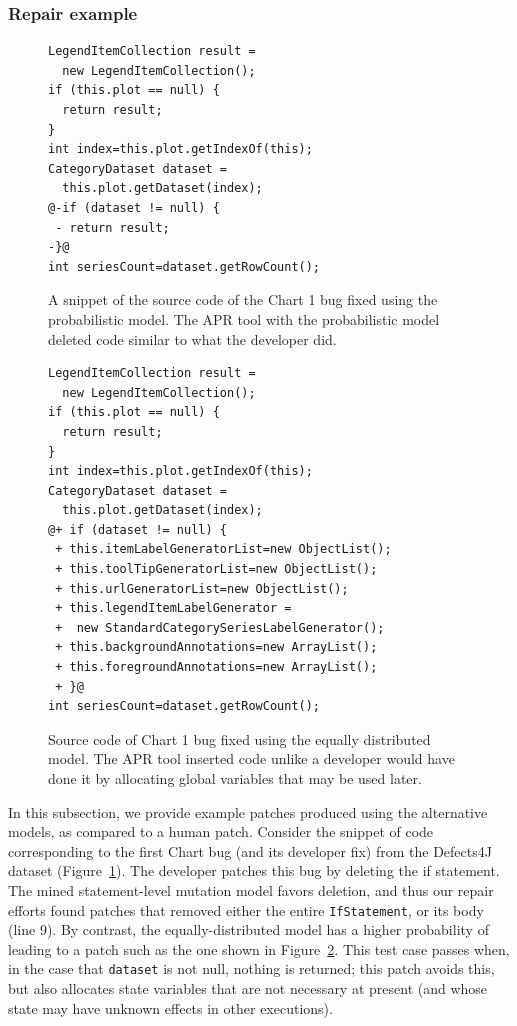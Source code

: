 \documentclass[conference]{IEEEtran}
\begin{document}
\subsubsection{Repair example} \label{examPatches}

\begin{figure}[t]
\begin{lstlisting}[frame=single,style=base]
LegendItemCollection result = 
  new LegendItemCollection();
if (this.plot == null) {
  return result;
}
int index=this.plot.getIndexOf(this);
CategoryDataset dataset = 
  this.plot.getDataset(index);
@-if (dataset != null) {
 - return result;
-}@
int seriesCount=dataset.getRowCount();
	\end{lstlisting}
	\caption{A snippet of the source code of the Chart 1 bug fixed using the
      probabilistic model. The APR tool with the probabilistic model deleted code similar to what the
      developer did.\label{fig:chart1.1}}
\end{figure}

\begin{figure}[t]
\begin{lstlisting}[frame=single,style=base]
LegendItemCollection result = 
  new LegendItemCollection();
if (this.plot == null) {
  return result;
}
int index=this.plot.getIndexOf(this);
CategoryDataset dataset = 
  this.plot.getDataset(index);
@+ if (dataset != null) { 
 + this.itemLabelGeneratorList=new ObjectList();
 + this.toolTipGeneratorList=new ObjectList();
 + this.urlGeneratorList=new ObjectList();
 + this.legendItemLabelGenerator = 
 +  new StandardCategorySeriesLabelGenerator();
 + this.backgroundAnnotations=new ArrayList();
 + this.foregroundAnnotations=new ArrayList();
 + }@
int seriesCount=dataset.getRowCount();
	\end{lstlisting}
	\caption{Source code of Chart 1 bug fixed using the equally distributed
      model. The APR tool inserted code unlike a developer would have done it by
      allocating global variables that may be used later.\label{fig:chart1.3}}

\end{figure}


In this subsection, we provide example patches produced using the alternative
models, as compared to a human patch.  Consider the snippet of code corresponding
to the first Chart bug (and its developer fix) from the Defects4J dataset
(Figure~\ref{fig:chart1.1}).  The developer patches this bug by deleting the if
statement.  The mined statement-level mutation model favors deletion, and thus
our repair efforts found patches that removed either the entire \texttt{IfStatement}, or its body (line 9).
By contrast, the equally-distributed model has a higher probability of leading
to a patch such as the one shown in Figure~\ref{fig:chart1.3}.  This test case
passes when, in the case that \texttt{dataset} is not null, nothing is returned;
this patch avoids this, but also allocates state variables that are not
necessary at present (and whose state may have unknown effects in other
executions). 
\end{document}
